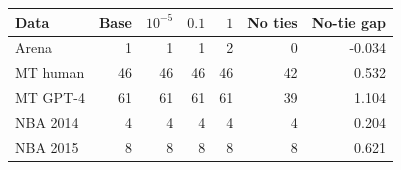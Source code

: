 \begin{tabular}{lrrrrrr}
\toprule
Data & Base & $10^{-5}$ & $0.1$ & $1$ & No ties & No-tie gap \\
\midrule
Arena & 1 & 1 & 1 & 2 & 0 & -0.034 \\
MT human & 46 & 46 & 46 & 46 & 42 & 0.532 \\
MT GPT-4 & 61 & 61 & 61 & 61 & 39 & 1.104 \\
NBA 2014 & 4 & 4 & 4 & 4 & 4 & 0.204 \\
NBA 2015 & 8 & 8 & 8 & 8 & 8 & 0.621 \\
\bottomrule
\end{tabular}
